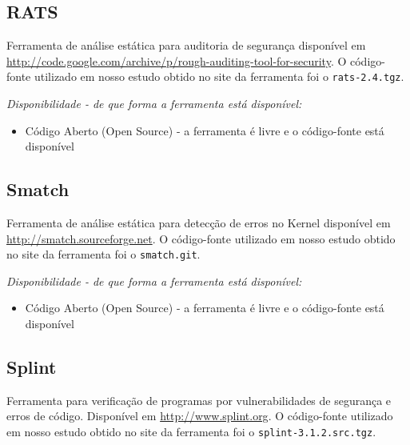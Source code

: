 \subsection{RATS}

Ferramenta de análise estática para auditoria de segurança disponível em
\url{http://code.google.com/archive/p/rough-auditing-tool-for-security}. O
código-fonte utilizado em nosso estudo obtido no site da ferramenta foi o
\texttt{rats-2.4.tgz}.

\begin{description}

  \item {\it Disponibilidade - de que forma a ferramenta está disponível:}
    \begin{itemize}
      \item Código Aberto (Open Source) - a ferramenta é livre e o código-fonte está disponível
    \end{itemize}

\end{description}

\subsection{Smatch}

Ferramenta de análise estática para detecção de erros no Kernel disponível em
\url{http://smatch.sourceforge.net}. O código-fonte utilizado em nosso estudo
obtido no site da ferramenta foi o \texttt{smatch.git}.

\begin{description}

  \item {\it Disponibilidade - de que forma a ferramenta está disponível:}
    \begin{itemize}
      \item Código Aberto (Open Source) - a ferramenta é livre e o código-fonte está disponível
    \end{itemize}

\end{description}

\subsection{Splint}

Ferramenta para verificação de programas por vulnerabilidades de segurança e
erros de código. Disponível em \url{http://www.splint.org}. O código-fonte
utilizado em nosso estudo obtido no site da ferramenta foi o
\texttt{splint-3.1.2.src.tgz}.

